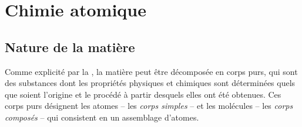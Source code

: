\chapter{Chimie atomique\label{chap:chimie_atomique}}
\ChapFrame %

\section{Nature de la matière}

Comme explicité par la  %
, la matière peut être décomposée en corps purs, qui sont des substances dont les propriétés physiques et chimiques sont déterminées quels que soient l'origine et le procédé à partir desquels elles ont été obtenues. Ces corps purs désignent les atomes -- les \emph{corps simples} -- et les molécules -- les \emph{corps composés} -- qui consistent en un assemblage d'atomes.
 
